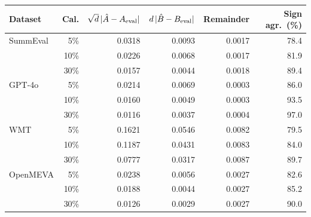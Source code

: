 \begin{tabular}{lrrrrr}
\toprule
Dataset & Cal. & $\sqrt{d}\,|\hat A-A_{\rm eval}|$ & $d\,|\hat B-B_{\rm eval}|$ & Remainder & Sign agr.\ (\%) \\
\midrule
SummEval & 5\% & 0.0318 & 0.0093 & 0.0017 & 78.4 \\
 & 10\% & 0.0226 & 0.0068 & 0.0017 & 81.9 \\
 & 30\% & 0.0157 & 0.0044 & 0.0018 & 89.4 \\
\midrule
GPT-4o & 5\% & 0.0214 & 0.0069 & 0.0003 & 86.0 \\
 & 10\% & 0.0160 & 0.0049 & 0.0003 & 93.5 \\
 & 30\% & 0.0116 & 0.0037 & 0.0004 & 97.0 \\
\midrule
WMT & 5\% & 0.1621 & 0.0546 & 0.0082 & 79.5 \\
 & 10\% & 0.1187 & 0.0431 & 0.0083 & 84.0 \\
 & 30\% & 0.0777 & 0.0317 & 0.0087 & 89.7 \\
\midrule
OpenMEVA & 5\% & 0.0238 & 0.0056 & 0.0027 & 82.6 \\
 & 10\% & 0.0188 & 0.0044 & 0.0027 & 85.2 \\
 & 30\% & 0.0126 & 0.0029 & 0.0027 & 90.0 \\
\bottomrule
\end{tabular}
